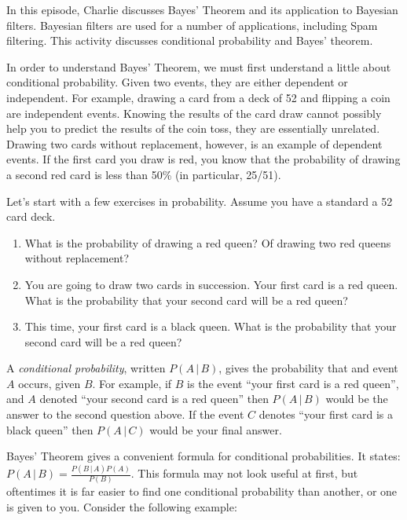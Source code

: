 \newpage
{}
{}
\setcounter{activity}{0}

In this episode, Charlie discusses Bayes' Theorem and its application to Bayesian filters. Bayesian filters are used for a number of applications, including Spam filtering. This activity discusses conditional probability and Bayes' theorem.




In order to understand Bayes' Theorem, we must first understand a little about conditional probability. Given two events, they are either dependent or independent. For example, drawing a card from a deck of 52 and flipping a coin are independent events. Knowing the results of the card draw cannot possibly help you to predict the results of the coin toss, they are essentially unrelated. Drawing two cards without replacement, however, is an example of dependent events. If the first card you draw is red, you know that the probability of drawing a second red card is less than 50\% (in particular, 25/51).




Let's start with a few exercises in probability. Assume you have a standard a 52 card deck.
	\begin{enumerate}[1.]
	\item What is the probability of drawing a red queen? Of drawing two red queens without replacement?
	\item You are going to draw two cards in succession. Your first card is a red queen. What is the probability that your second card will be a red queen?
	\item This time, your first card is a black queen. What is the probability that your second card will be a red queen?
	\end{enumerate}
	
	
A \emph{conditional probability}, written $P(A\,|\,B)$, gives the probability that and event $A$ occurs, given $B$. For example, if $B$ is the event ``your first card is a red queen'', and $A$ denoted ``your second card is a red queen'' then $P(A\,|\,B)$ would be the answer to the second question above. If the event $C$ denotes ``your first card is a black queen'' then $P(A\,|\,C)$ would be your final answer.


Bayes' Theorem gives a convenient formula for conditional probabilities. It states: $P(A\,|\,B) = \frac{P(B\,|\,A)P(A)}{P(B)}$. This formula may not look useful at first, but oftentimes it is far easier to find one conditional probability than another, or one is given to you. Consider the following example:


